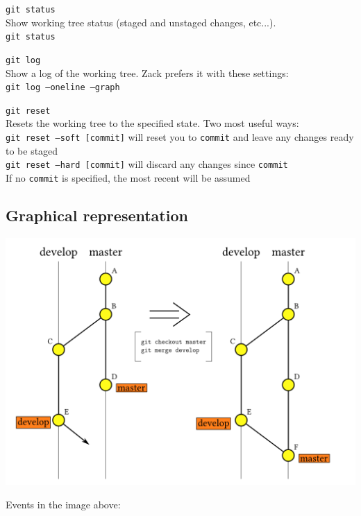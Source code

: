 \documentclass{article}
\begin{document}
\begin{description}
	\item \texttt{git status}
		\\Show working tree status (staged and unstaged changes, etc...).
		\\\texttt{git status}
	\item \texttt{git log}
		\\Show a log of the working tree. Zack prefers it with these settings:
		\\\texttt{git log --oneline --graph}
	\item \texttt{git reset}
		\\Resets the working tree to the specified state. Two most useful ways:
		\\\texttt{git reset --soft [commit]} will reset you to \texttt{commit} and leave any changes ready to be staged
		\\\texttt{git reset --hard [commit]} will discard any changes since \texttt{commit}
		\\If no \texttt{commit} is specified, the most recent will be assumed
\end{description}

\pagebreak

\subsection{Graphical representation}

\begin{center}
	\includegraphics[width=15cm]{commit-merge.png}
\end{center}

Events in the image above:
\end{document}
